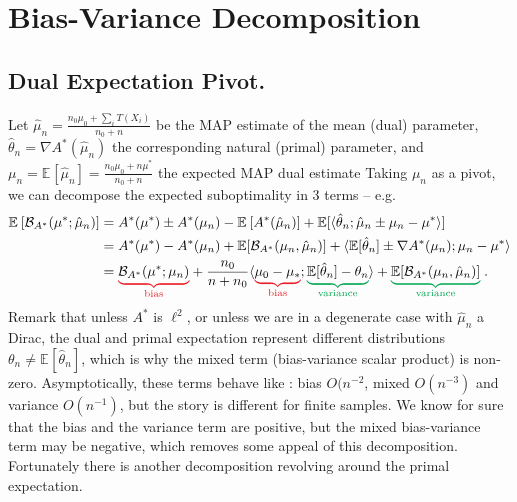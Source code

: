\documentclass{article}
\newcommand*{\expect}[2][]{\ensuremath{\mathbb{E}_{#1} \left[ #2 \right] }} %
\newcommand{\logpart}{A}
\newcommand{\conj}{\logpart^*}
\newcommand{\bregmanconj}{\cB_{\logpart^*}}
\newcommand{\nat}{\theta}
\newcommand{\MAPm}{\hat \mu_n}
\begin{document}
\section{Bias-Variance Decomposition}
\newcommand{\bias}[1]{\textcolor{Red}{\underbrace{\textcolor{black}{#1}}_{\text{bias}}}}
\newcommand{\variance}[1]{\textcolor{Green}{\underbrace{\textcolor{black}{#1}}_{\text{variance}}}}

\subsection{Dual Expectation Pivot.}
Let $\hat \mu_n = \frac{n_0 \mu_0 + \sum_i T(X_i)}{n_0 + n}$ be the MAP estimate of the mean (dual) parameter, $\hat \nat_n = \nabla \conj(\hat \mu_n)$ the corresponding natural (primal) parameter, and
$\mu_n = \expect{\hat \mu_n} = \frac{n_0 \mu_0 + n \mu^*}{n_0 + n}$ the expected MAP dual estimate
Taking $\mu_n$ as a pivot, we can decompose the expected suboptimality in 3 terms -- e.g. 
\begin{align}
	\expect{\bregmanconj(\mu^* ; \hat \mu_n)} 
	&= \conj(\mu^* ) 
	\pm \conj(\mu_n)
	-  \expect{\conj(\hat \mu_n)}
	+ \E[\langle \hat \nat_n ; \hat \mu_n   \pm \mu_n - \mu^*  \rangle ] 
	\nonumber \\
	&= \conj(\mu^* ) 
	- \conj(\mu_n)  + \E[\bregmanconj(\mu_n, \MAPm)]
	+ \langle \E[\hat \nat_n] \pm \nabla \conj(\mu_n) ;  \mu_n - \mu^* \rangle
	\nonumber\\
	& = \bias{\bregmanconj(\mu^*; \mu_n)}
	+ \frac{n_0}{n+n_0} \langle  \bias{\mu_0 - \mu_*} ; \variance{\E[\hat \nat_n] - \nat_n} \rangle 
	+ \variance{\E[\bregmanconj(\mu_n, \MAPm)]} \; .
	\label{eq:bias-mixed-variance}
\end{align}
Remark that unless $\conj$ is $\ell^2$, or unless we are in a degenerate case with $\hat \mu_n$ a Dirac, the dual and primal expectation represent different distributions $\theta_n \neq \expect{\hat \theta_n}$, which is why the mixed term (bias-variance scalar product) is non-zero.
Asymptotically, these terms behave like : bias $O(n^{-2}$, mixed $O(n^{-3})$ and variance $O(n^{-1})$, but the story is different for finite samples.
We know for sure that the bias and the variance term are positive, but the mixed bias-variance term may be negative, which removes some appeal of this decomposition. 
Fortunately there is another decomposition revolving around the primal expectation.

\end{document}
